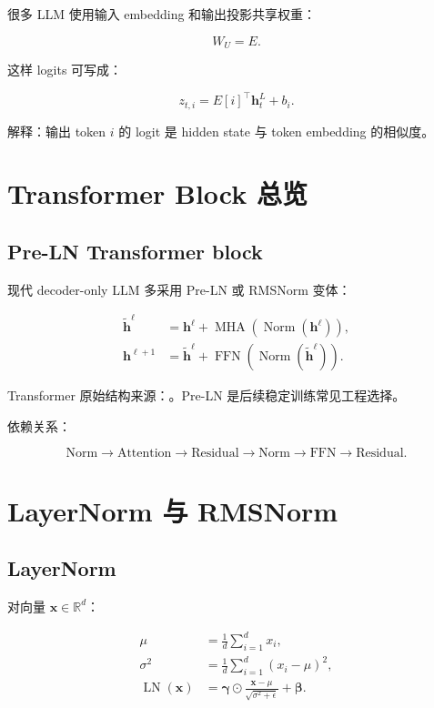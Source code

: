 \documentclass[UTF8,12pt]{ctexart}
\newcommand{\R}{\mathbb{R}}
\newcommand{\1}{\mathbf{1}}
\newcommand{\LN}{\operatorname{LN}}
\newcommand{\MHA}{\operatorname{MHA}}
\newcommand{\FFN}{\operatorname{FFN}}
\begin{document}
很多 LLM 使用输入 embedding 和输出投影共享权重：

\begin{equation}
W_U = E.
\end{equation}

这样 logits 可写成：

\begin{equation}
z_{t,i}=E[i]^\top \bm{h}_t^L+b_i.
\end{equation}

解释：输出 token $i$ 的 logit 是 hidden state 与 token embedding 的相似度。

\section{Transformer Block 总览}

\subsection{Pre-LN Transformer block}

现代 decoder-only LLM 多采用 Pre-LN 或 RMSNorm 变体：

\begin{align}
\tilde{\bm{h}}^\ell
&=\bm{h}^{\ell}
+\MHA(\operatorname{Norm}(\bm{h}^{\ell})),\\
\bm{h}^{\ell+1}
&=\tilde{\bm{h}}^\ell
+\FFN(\operatorname{Norm}(\tilde{\bm{h}}^\ell)).
\label{eq:preln-block}
\end{align}

Transformer 原始结构来源：\cite{vaswani2017attention}。Pre-LN 是后续稳定训练常见工程选择。

依赖关系：

\[
\text{Norm}
\rightarrow
\text{Attention}
\rightarrow
\text{Residual}
\rightarrow
\text{Norm}
\rightarrow
\text{FFN}
\rightarrow
\text{Residual}.
\]

\section{LayerNorm 与 RMSNorm}

\subsection{LayerNorm}

对向量 $\bm{x}\in\R^d$：

\begin{align}
\mu &= \frac{1}{d}\sum_{i=1}^{d}x_i,\\
\sigma^2 &= \frac{1}{d}\sum_{i=1}^{d}(x_i-\mu)^2,\\
\LN(\bm{x})
&=\bm{\gamma}\odot
\frac{\bm{x}-\mu}{\sqrt{\sigma^2+\epsilon}}
+\bm{\beta}.
\label{eq:layernorm}
\end{align}
\end{document}

